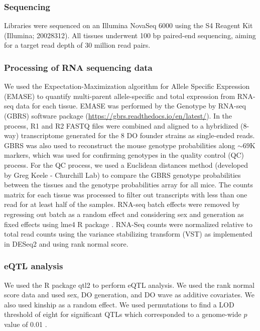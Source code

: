 \documentclass[
]{article}
\begin{document}
\subsubsection{Sequencing}\label{sequencing}

Libraries were sequenced on an Illumina NovaSeq 6000 using the S4
Reagent Kit (Illumina; 20028312). All tissues underwent 100 bp
paired-end sequencing, aiming for a target read depth of 30 million read
pairs.

\subsubsection{Processing of RNA sequencing
data}\label{processing-of-rna-sequencing-data}

We used the Expectation-Maximization algorithm for Allele Specific
Expression (EMASE) \cite{pmid29444201, pmid25236449} to quantify
multi-parent allele-specific and total expression from RNA-seq data for
each tissue. EMASE was performed by the Genotype by RNA-seq (GBRS)
software package (\url{https://gbrs.readthedocs.io/en/latest/}). In the
process, R1 and R2 FASTQ files were combined and aligned to a hybridized
(8-way) transcriptome generated for the 8 DO founder strains as
single-ended reads. GBRS was also used to reconstruct the mouse genotype
probabilities along \(\sim69\)K markers, which was used for confirming
genotypes in the quality control (QC) process. For the QC process, we
used a Euclidean distances method (developed by Greg Keele - Churchill
Lab) to compare the GBRS genotype probabilities between the tissues and
the genotype probabilities array for all mice. The counts matrix for
each tissue was processed to filter out transcripts with less than one
read for at least half of the samples. RNA-seq batch effects were
removed by regressing out batch as a random effect and considering sex
and generation as fixed effects using lme4 R package
\cite{lme4_package}. RNA-Seq counts were normalized relative to total
read counts using the variance stabilizing transform (VST) as
implemented in DESeq2 \cite{deseq2} and using rank normal score.

\subsubsection{eQTL analysis}\label{eqtl-analysis}

We used the R package qtl2 \cite{pmid30591514} to perform eQTL analysis.
We used the rank normal score data and used sex, DO generation, and DO
wave as additive covariates. We also used kinship as a random effect. We
used permutations to find a LOD threshold of eight for significant QTLs
which corresponded to a genome-wide \(p\) value of 0.01
\cite{pmid7851788}.
\end{document}
